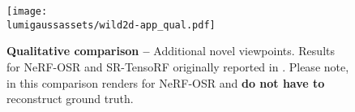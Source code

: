
\begin{figure}[!t]
  \centering
  \texttt{[image: \\lumigaussassets/wild2d-app\_qual.pdf]}
  \caption{ \textbf{Qualitative comparison --}
    Additional novel viewpoints.
    Results for NeRF-OSR and SR-TensoRF originally reported in
    \cite{chang2024srtensorf}.
    Please note, in this comparison renders for NeRF-OSR and \lumigauss
    \textbf{do not have to} reconstruct ground truth.
  }
  \label{fig:lumigauss-qual_more_viewpoints_supp_img}
\end{figure}